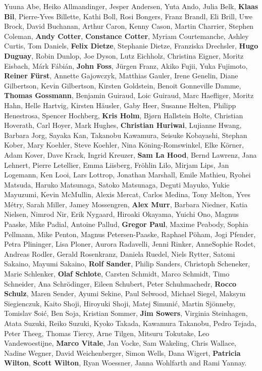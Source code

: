 Yuuna Abe,
Heiko Allmandinger,
Jesper Andersen,
Yuta Ando,
Julia Belk,
\textbf{Klaas Bil},
Pierre-Yves Billette,
Kathi Boll,
Rosi Bongers,
Franz Brandl,
Eli Brill,
Uwe Brock,
David Buchanan,
Arthur Caron,
Kenny Cason,
Martin  Charrier,
Stephen Coleman,
\textbf{Andy Cotter},
\textbf{Constance Cotter},
Myriam Courtemanche,
Ashley  Curtis,
Tom Daniels,
\textbf{Felix Dietze},
Stephanie Dietze,
Franziska Drechsler,
\textbf{Hugo Duguay},
Robin Dunlop,
Joe Dyson,
Lutz Eichholz,
Christina Eigner,
Moritz Eisbach,
M\'{a}rk  F\'{a}bi\'{a}n,
\textbf{John Foss},
J\"{u}rgen  Franz,
Akiko Fujii,
Yuka Fujimoto,
\textbf{Reiner F\"{u}rst},
Annette Gajowczyk,
Matthias Gauler,
Irene Genelin,
Diane Gilbertson,
Kevin Gilbertson,
Kirsten Goldstein,
Benoit Gonneville Damme,
\textbf{Thomas Gossmann},
Benjamin Guiraud,
Loic Guiraud,
Marc Haefliger,
Moritz Hahn,
Helle Hartvig,
Kirsten H\"{a}usler,
Gaby Heer,
Susanne Helten,
Philipp Henestrosa,
Spencer Hochberg,
\textbf{Kris Holm},
Bj{\o}rn Hallstein Holte,
Christian Hoverath,
Carl Hoyer,
Mark Hughes,
\textbf{Christian Huriwai},
Lujianne Hwang,
Barbara Jorg,
Sayaka Kan,
Takanobu Kawamura,
Seisuke Kobayashi,
Stephan Kober,
Mary Koehler,
Steve Koehler,
Nina K\"{o}ning-Romswinkel,
Elke K\"{o}rner,
Adam Kover,
Dave Krack,
Ingrid Kreuzer,
\textbf{Sam La Hood},
Bernd Lawrenz,
Jana Lehnert,
Pierre Letellier,
Emma Liisberg,
Fr\"{o}hlin Lilo,
Mirjam  Lips,
Jan Logemann,
Ken Looi,
Lars Lottrop,
Jonathan Marshall,
Emile Mathieu,
Ryohei Matsuda,
Haruko Matsunaga,
Satoko Matsunaga,
Deguti Mayuko,
Yukie Mayuzumi,
Kevin McMullin,
Alexis  Mercat,
Carlos Medina,
Tony Melton,
Yves M\'{e}try,
Sarah Miller,
Jamey Mossengren,
\textbf{Alex  Murr},
Barbara Niedner,
Katia Nielsen,
Nimrod Nir,
Erik Nygaard,
Hiroaki Okayama,
Yuichi Ono,
Magnus Paaske,
Mike Padial,
Antoine Pallud,
\textbf{Gregor Paul},
Maxime Peabody,
Sophia Pellmann,
Mike Penton,
Magnus Petersen-Paaske,
Raphael P\"{o}ham,
Jogi Pfender,
Petra Plininger,
Lisa Ploner,
Aurora Radavelli,
Jenni Rinker,
AnneSophie Rodet,
Andreas Rodler,
Gerald  Rosenkranz,
Daniela Ruedel,
Niels Rytter,
Satomi Sakaino,
Mayumi Sakaino,
\textbf{Rolf Sander},
Philip  Sanders,
Christoph Scheneker,
Marie Schlenker,
\textbf{Olaf Schlote},
Carsten Schmidt,
Marco Schmidt,
Timo Schneider,
Ana Schr\"{o}dinger,
Eileen Schubert,
Peter Schuhmachedr,
\textbf{Rocco Schulz},
Maren Sender,
Ayumi Sekine,
Paul Selwood,
Michael Siegel,
Maksym  Siegienczuk,
Kaito Shoji,
Hiroyuki Shoji,
Matej \u{S}imuni\'{c},
Martin Sjönneby,
Tomislav \u{S}oi\'{c},
Ben Soja,
Kristian Sommer,
\textbf{Jim Sowers},
Virginia Steinhagen,
Atata Suzuki,
Reiko Suzuki,
Kyoko Takada,
Kawamura Takanobu,
Pedro Tejada,
Peter Theeg,
Thomas  Tiercy,
Arne Tilgen,
Mitsuru Tokutake,
Leo Vandewoestijne,
\textbf{Marco Vitale},
Jan Vocke,
Sam Wakeling,
Chris Wallace,
Nadine Wegner,
David Weichenberger,
Simon Wells,
Dana Wigert,
\textbf{Patricia  Wilton},
\textbf{Scott Wilton},
Ryan Woessner,
Janna Wohlfarth
and
Rami Yannay.